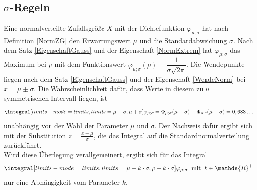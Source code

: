 \subsection{\texorpdfstring{\(\sigma\)}{Sigma}-Regeln}
Eine normalverteilte Zufallsgröße \(X\) mit der Dichtefunktion \(\varphi_{\mu;\sigma}\) hat nach Definition \ref{NormZG} den Erwartungswert \(\mu\) und die Standardabweichung \(\sigma\). Nach dem Satz \ref{EigenschaftGauss} und der Eigenschaft \ref{NormExtrem} hat \(\varphi_{\mu;\sigma}\) das Maximum bei \(\mu\) mit dem Funktionswert \(\varphi_{\mu;\sigma}(\mu) = \dfrac{1}{\sigma\sqrt{2\pi}}\). Die Wendepunkte liegen nach dem Satz \ref{EigenschaftGauss} und der Eigenschaft \ref{WendeNorm} bei \(x= \mu \pm \sigma\). Die Wahrscheinlichkeit dafür, dass Werte in diesem zu \(\mu \) symmetrischen Intervall liegen, ist 
\[\integral[limits-mode=limits,limits={\mu - \sigma , \mu + \sigma}]{\varphi_{\mu;\sigma}} =\Phi_{\mu;\sigma} (\mu + \sigma) - \Phi_{\mu;\sigma} (\mu - \sigma) = 0,683\ldots\] unabhängig von der Wahl der Parameter \(\mu\) und \(\sigma\). Der Nachweis dafür ergibt sich mit der Substitution \(z=\frac{x-\mu}{\sigma}\), die das Integral auf die Standardnormalverteilung zurückführt.\\
Wird diese Überlegung verallgemeinert, ergibt sich für das Integral \[\integral[limits-mode=limits,limits={\mu - k\cdot\sigma , \mu + k\cdot\sigma}]{\varphi_{\mu;\sigma}}\hspace{0.2cm} \text{mit} \hspace{0.2cm} k\in \mathds{R}^+\] nur eine Abhängigkeit vom Parameter \(k\). 

